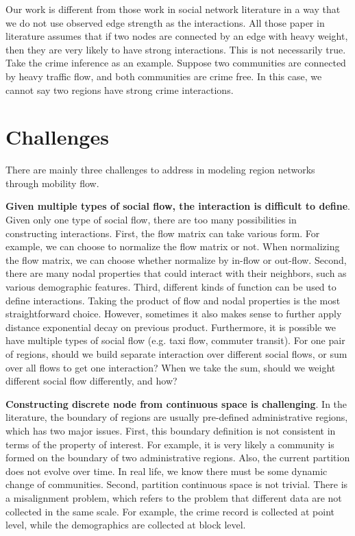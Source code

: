 Our work is different from those work in social network literature in a way that we do not use observed edge strength as the interactions. All those paper in literature assumes that if two nodes are connected by an edge with heavy weight, then they are very likely to have strong interactions. This is not necessarily true. Take the crime inference as an example. Suppose two communities are connected by heavy traffic flow, and both communities are crime free. In this case, we cannot say two regions have strong crime interactions.







\section{Challenges}

There are mainly three challenges to address in modeling region networks through mobility flow.

\textbf{Given multiple types of social flow, the interaction is difficult to define}. Given only one type of social flow, there are too many possibilities in constructing interactions.  First, the flow matrix can take various form. For example, we can choose to normalize the flow matrix or not. When normalizing the flow matrix, we can choose whether normalize by in-flow or out-flow. Second, there are many nodal properties that could interact with their neighbors, such as various demographic features. Third, different kinds of function can be used to define interactions. Taking the product of flow and nodal properties is the most straightforward choice. However, sometimes it also makes sense to further apply distance exponential decay on previous product.  Furthermore, it is possible we have multiple types of social flow (e.g. taxi flow, commuter transit). For one pair of regions, should we build separate interaction over different social flows, or sum over all flows to get one interaction? When we take the sum, should we weight different social flow differently, and how?



\textbf{Constructing discrete node from continuous space is challenging}. In the literature, the boundary of regions are usually pre-defined administrative regions, which has two major issues. First, this boundary definition is not consistent in terms of the property of interest. For example, it is very likely a community is formed on the boundary of two administrative regions. Also, the current partition does not evolve over time. In real life, we know there must be some dynamic change of communities. Second, partition continuous space is not trivial. There is a misalignment problem, which refers to the problem that different data are not collected in the same scale. For example, the crime record is collected at point level, while the demographics are collected at block level.




